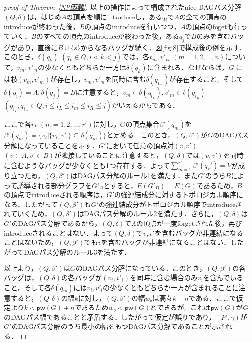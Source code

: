 \documentclass[master]{kuisthesis}		%
\theoremstyle{plain}
\theoremstyle{definition}
\begin{document}
{\begin{proof}[proof of Theorem~\ref{NP困難}]
    以上の操作によって構成されたnice DAGパス分解$(Q, \delta)$は，はじめ$A$の頂点を順にintroduceし，ある$q_i$で$A$の全ての頂点のintroduceが終わった後，$B$の頂点のintroduceを行いつつ，$A$の頂点のfogetも行っていく．$B$のすべての頂点のintroduceが終わった後，ある$q_j$で$B$のみを含むバッグがあり，直後に$B \cup \{s\}$からなるバッグが続く．図\ref{fig:8}で構成後の例を示す．このとき，$\delta(q_k)$ $(q_k \in Q, i < k < j)$では，各$v_m, v'_m$ $(m = 1, 2, \dots, n)$について，$v_m, v'_m$の少なくともどちらか一方は$\delta(q_k)$に含まれる．なぜならば，$G'$には枝$(v_m, v'_m)$が存在し，$v_m, v'_m$を同時に含む$\delta(q_{i_m})$が存在すること，そして$\delta(q_i) = A, \delta(q_j) = B$に注意すると，$v_m \in \delta(q_{i_L}), v'_m \in \delta(q_{i_R})$ $(q_{i_L}, q_{i_R} \in Q, i \leq i_L \leq i_m \leq i_R \leq j)$がいえるからである．
    
    ここで各$m$ $(m = 1, 2, \dots, r')$に対し，$G$の頂点集合$\beta'(q_m)$を$\beta'(q_m) = \{v_i | \{v_i, v'_i\} \subseteq \delta(q_m) \}$と定める．このとき，$(Q, \beta')$が$G$のDAGパス分解になっていることを示す．$G'$において任意の頂点対$(v, v')$ $(v \in A, v' \in B)$が隣接していることに注意すると，$(Q, \delta)$では$(v, v')$を同時に含むようなバッグが少なくとも1つ存在する．よって$\sum_{m=1}^{r'}\beta'(q_r') = V$が成り立つため，$(Q, \beta')$はDAGパス分解のルール1を満たす．また$G'$のうち$B$によって誘導される部分グラフを$G'_B$とすると，$E(G'_B) = E(G)$であるため，$B$の頂点でintroduceされる順序は，$G'$の強連結成分に対するトポロジカル順序になる．したがって$(Q, \beta')$も$G'$の強連結成分がトポロジカル順序でintroduceされていくため，$(Q, \beta')$はDAGパス分解のルール2を満たす．さらに，$(Q, \delta)$は$G'$のDAGパス分解であるから，$(Q, \delta)$で$A$の頂点が一度forgetされた後，再びintroduceされることはない．よって$(Q, \delta)$で${v, v'}$を含むバッグが非連結になることはないため，$(Q, \beta')$でも$v$を含むバッグが非連結になることはない．したがってDAGパス分解のルール3を満たす．

    以上より，$(Q, \beta')$は$G$のDAGパス分解になっている．このとき，$(Q, \beta')$の各バッグは，$(Q, \delta)$の各バッグが$(v_i, v'_i)$を同時に含む場合のみ$v_i$を含んでいること，そして各$\delta(q_m)$には$v_i, v'_i$の少なくともどちらか一方が含まれることに注意すると，$(Q, \delta)$の幅$k$に対し，$(Q, \beta')$の幅$w_b$は高々$k - n$である．ここで仮定より$k < \mathsf{pw}(G) + n$であるため$w_b < \mathsf{pw}(G)$とできるが，これは$\mathsf{pw}(G)$が$G$のDAGパス幅であることと矛盾する．したがって仮定が誤りであり，$(P', \gamma)$が$G'$のDAGパス分解のうち最小の幅をもつDAGパス分解であることが示される．
    

\end{proof}}
\end{document}

